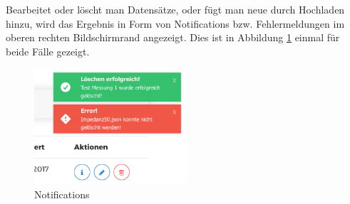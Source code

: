 Bearbeitet oder löscht man Datensätze, oder fügt man neue durch Hochladen hinzu, wird das Ergebnis in Form von Notifications bzw. Fehlermeldungen im oberen rechten Bildschirmrand angezeigt. Dies ist in Abbildung \ref{fig:notifications} einmal für beide Fälle gezeigt.

\begin{figure}
\centering
\includegraphics[width=0.5\textwidth]{Figures/notifications}
\caption{Notifications}
\label{fig:notifications}
\end{figure}

